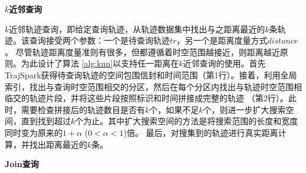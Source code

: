 \textbf{$k$近邻查询}


$k$近邻轨迹查询，即给定查询轨迹，从轨迹数据集中找出与之距离最近的$k$条轨迹。该查询接受两个参数：一个是待查询轨迹$tr$，另一个是距离度量方式$distance$。
尽管轨迹距离度量准则有很多，但都遵循着时空范围越接近，则距离越近原则。为此设计了算法 \ref{alg:knn}以支持任一距离在$k$近邻查询的使用。首先 TrajSpark获得待查询轨迹的空间包围信封和时间范围（第1行）。接着，利用全局索引，找出与查询时空范围相交的分区，然后在每个分区内找出与轨迹时空范围相临交的轨迹片段，并将这些片段按照标识和时间拼接成完整的轨迹 （第2行）。此时，需要检查拼接后的轨迹数目是否有$k$个，如果不足$k$个，则进一步扩大搜索空间，直到找到超过$k$个为止。其中扩大搜索空间的方法是将搜索范围的长度和宽度同时变为原来的$1+\alpha$ ($0 < \alpha < 1$)倍。
最后，对搜集到的轨迹进行真实距离计算，并找出距离最近的$k$条。

\textbf{Join查询}

